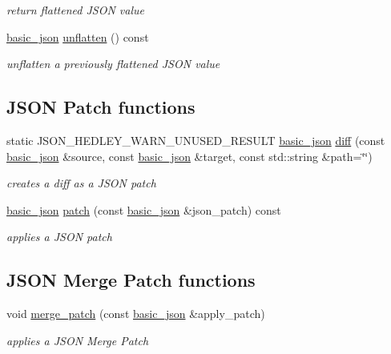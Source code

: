 \begin{DoxyCompactItemize}
\begin{DoxyCompactList}\small\item\em return flattened J\+S\+ON value \end{DoxyCompactList}\item 
\hyperlink{classnlohmann_1_1basic__json}{basic\+\_\+json} \hyperlink{classnlohmann_1_1basic__json_abb58a0ce5996bd3bc17a3dd954217af6}{unflatten} () const 
\begin{DoxyCompactList}\small\item\em unflatten a previously flattened J\+S\+ON value \end{DoxyCompactList}\end{DoxyCompactItemize}
\subsection*{J\+S\+ON Patch functions}
\begin{DoxyCompactItemize}
\item 
static J\+S\+O\+N\+\_\+\+H\+E\+D\+L\+E\+Y\+\_\+\+W\+A\+R\+N\+\_\+\+U\+N\+U\+S\+E\+D\+\_\+\+R\+E\+S\+U\+LT \hyperlink{classnlohmann_1_1basic__json}{basic\+\_\+json} \hyperlink{classnlohmann_1_1basic__json_a9c4f3554773649beef69461a10a3de87}{diff} (const \hyperlink{classnlohmann_1_1basic__json}{basic\+\_\+json} \&source, const \hyperlink{classnlohmann_1_1basic__json}{basic\+\_\+json} \&target, const std\+::string \&path=\char`\"{}\char`\"{})
\begin{DoxyCompactList}\small\item\em creates a diff as a J\+S\+ON patch \end{DoxyCompactList}\item 
\hyperlink{classnlohmann_1_1basic__json}{basic\+\_\+json} \hyperlink{classnlohmann_1_1basic__json_ad87518a27b13f886b836bb93213e6515}{patch} (const \hyperlink{classnlohmann_1_1basic__json}{basic\+\_\+json} \&json\+\_\+patch) const 
\begin{DoxyCompactList}\small\item\em applies a J\+S\+ON patch \end{DoxyCompactList}\end{DoxyCompactItemize}
\subsection*{J\+S\+ON Merge Patch functions}
\begin{DoxyCompactItemize}
\item 
void \hyperlink{classnlohmann_1_1basic__json_a7c43ed2a3004c1fa9543913f37b9fca9}{merge\+\_\+patch} (const \hyperlink{classnlohmann_1_1basic__json}{basic\+\_\+json} \&apply\+\_\+patch)
\begin{DoxyCompactList}\small\item\em applies a J\+S\+ON Merge Patch \end{DoxyCompactList}\end{DoxyCompactItemize}


